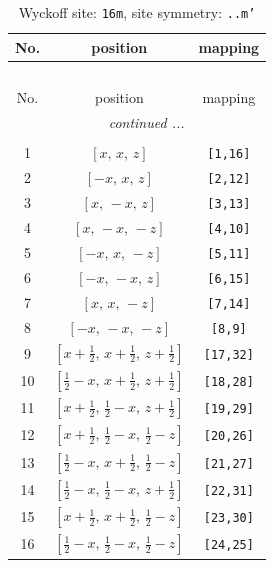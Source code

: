 \documentclass[fleqn,8pt]{jsarticle}
\begin{document}
\renewcommand{\arraystretch}{1.2}
\begin{longtable}{ccc}
\caption{Wyckoff site: {\tt 16m}, site symmetry: {\tt ..m'}}
 \\
 \hline \hline
No. & position & mapping \\ \hline \endfirsthead

\multicolumn{2}{l}{\tablename\ \thetable{}} \\
 \hline \hline
No. & position & mapping \\ \hline \endhead

 \hline \hline
\multicolumn{2}{r}{\footnotesize\it continued ...} \\ \endfoot

 \hline \hline
\multicolumn{2}{r}{} \\ \endlastfoot

1 & $\left[ x,\, x,\, z \right]$ & {\tt [1,16]} \\ \hline
2 & $\left[ - x,\, x,\, z \right]$ & {\tt [2,12]} \\ \hline
3 & $\left[ x,\, - x,\, z \right]$ & {\tt [3,13]} \\ \hline
4 & $\left[ x,\, - x,\, - z \right]$ & {\tt [4,10]} \\ \hline
5 & $\left[ - x,\, x,\, - z \right]$ & {\tt [5,11]} \\ \hline
6 & $\left[ - x,\, - x,\, z \right]$ & {\tt [6,15]} \\ \hline
7 & $\left[ x,\, x,\, - z \right]$ & {\tt [7,14]} \\ \hline
8 & $\left[ - x,\, - x,\, - z \right]$ & {\tt [8,9]} \\ \hline
9 & $\left[ x + \frac{1}{2},\, x + \frac{1}{2},\, z + \frac{1}{2} \right]$ & {\tt [17,32]} \\ \hline
10 & $\left[ \frac{1}{2} - x,\, x + \frac{1}{2},\, z + \frac{1}{2} \right]$ & {\tt [18,28]} \\ \hline
11 & $\left[ x + \frac{1}{2},\, \frac{1}{2} - x,\, z + \frac{1}{2} \right]$ & {\tt [19,29]} \\ \hline
12 & $\left[ x + \frac{1}{2},\, \frac{1}{2} - x,\, \frac{1}{2} - z \right]$ & {\tt [20,26]} \\ \hline
13 & $\left[ \frac{1}{2} - x,\, x + \frac{1}{2},\, \frac{1}{2} - z \right]$ & {\tt [21,27]} \\ \hline
14 & $\left[ \frac{1}{2} - x,\, \frac{1}{2} - x,\, z + \frac{1}{2} \right]$ & {\tt [22,31]} \\ \hline
15 & $\left[ x + \frac{1}{2},\, x + \frac{1}{2},\, \frac{1}{2} - z \right]$ & {\tt [23,30]} \\ \hline
16 & $\left[ \frac{1}{2} - x,\, \frac{1}{2} - x,\, \frac{1}{2} - z \right]$ & {\tt [24,25]} \\
\end{longtable}
\end{document}
